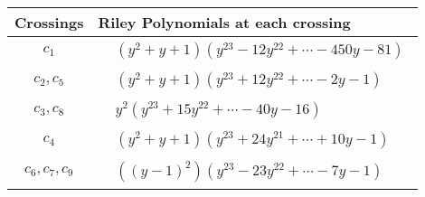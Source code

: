 \documentclass[1p]{elsarticle_modified}
\theoremstyle{definition}
\begin{document}
\begin{tabular}{m{50pt}|m{274pt}}
Crossings & \hspace{64pt}Riley Polynomials at each crossing \\
\hline $$\begin{aligned}c_{1}\end{aligned}$$&$\begin{aligned}
&(y^2+y+1)(y^{23}-12 y^{22}+\cdots-450 y-81)
\end{aligned}$\\
\hline $$\begin{aligned}c_{2},c_{5}\end{aligned}$$&$\begin{aligned}
&(y^2+y+1)(y^{23}+12 y^{22}+\cdots-2 y-1)
\end{aligned}$\\
\hline $$\begin{aligned}c_{3},c_{8}\end{aligned}$$&$\begin{aligned}
&y^2(y^{23}+15 y^{22}+\cdots-40 y-16)
\end{aligned}$\\
\hline $$\begin{aligned}c_{4}\end{aligned}$$&$\begin{aligned}
&(y^2+y+1)(y^{23}+24 y^{21}+\cdots+10 y-1)
\end{aligned}$\\
\hline $$\begin{aligned}c_{6},c_{7},c_{9}\end{aligned}$$&$\begin{aligned}
&((y-1)^2)(y^{23}-23 y^{22}+\cdots-7 y-1)
\end{aligned}$\\
\hline
\end{tabular}
\vskip 2pc
\end{document}
